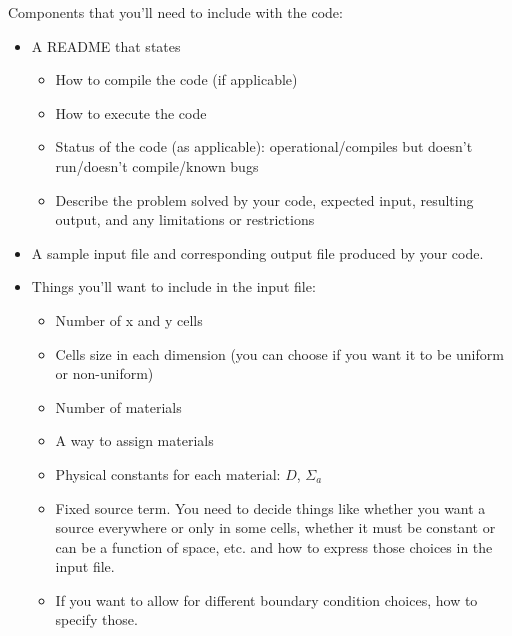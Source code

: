 \documentclass[12pt]{article}
\begin{document}
Components that you'll need to include with the code:
\begin{itemize}
\item A README that states
  \begin{itemize}
  \item How to compile the code (if applicable)
  \item How to execute the code
  \item Status of the code (as applicable): operational/compiles but doesn't run/doesn't compile/known bugs
  \item Describe the problem solved by your code, expected input, resulting output, and any limitations or restrictions
  \end{itemize}
  
\item A sample input file and corresponding output file produced by your code.

\item Things you'll want to include in the input file:
  \begin{itemize}
  \item Number of x and y cells
  \item Cells size in each dimension (you can choose if you want it to be uniform or non-uniform)
  \item Number of materials
  \item A way to assign materials
  \item Physical constants for each material: $D$, $\Sigma_a$
  \item Fixed source term. You need to decide things like whether you want a source everywhere or only in some cells, whether it must be constant or can be a function of space, etc. and how to express those choices in the input file.
  \item If you want to allow for different boundary condition choices, how to specify those.
  \end{itemize}
  
\end{itemize}
\end{document}
